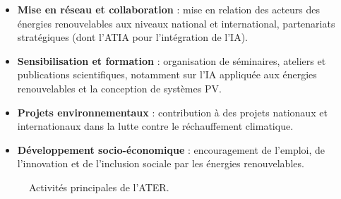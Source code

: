 \documentclass[12pt,a4paper,oneside]{report}
\begin{document}
\begin{itemize}[leftmargin=1.2cm]

\item \textbf{Mise en r\'{e}seau et collaboration} : mise en relation des acteurs des \'{e}nergies renouvelables aux niveaux national et international, partenariats strat\'{e}giques (dont l'ATIA pour l'int\'{e}gration de l'IA).

\item \textbf{Sensibilisation et formation} : organisation de s\'{e}minaires, ateliers et publications scientifiques, notamment sur l'IA appliqu\'{e}e aux \'{e}nergies renouvelables et la conception de syst\`{e}mes PV.

\item \textbf{Projets environnementaux} : contribution \`{a} des projets nationaux et internationaux dans la lutte contre le r\'{e}chauffement climatique.

\item \textbf{D\'{e}veloppement socio-\'{e}conomique} : encouragement de l'emploi, de l'innovation et de l'inclusion sociale par les \'{e}nergies renouvelables.

\end{itemize}



\begin{figure}[htbp]\centering
{}

\caption{Activit\'{e}s principales de l'ATER.}\label{fig:services_ater}

\end{figure}
\end{document}

